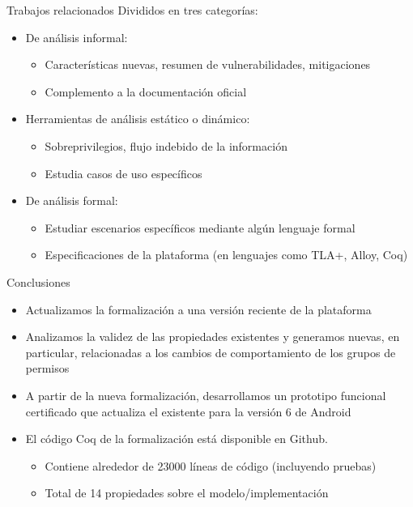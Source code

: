 \documentclass[pdf]{beamer} %
\begin{document}
\begin{frame}{Trabajos relacionados}
    Divididos en tres categorías:
    \begin{itemize}
        \item De análisis informal:
              \begin{itemize}
                  \item Características nuevas, resumen de vulnerabilidades, mitigaciones
                  \item Complemento a la documentación oficial
              \end{itemize}
              \pause
        \item Herramientas de análisis estático o dinámico:
              \begin{itemize}
                  \item Sobreprivilegios, flujo indebido de la información
                  \item Estudia casos de uso específicos
              \end{itemize}
              \pause
        \item De análisis formal:
              \begin{itemize}
                  \item Estudiar escenarios específicos mediante algún lenguaje formal
                  \item Especificaciones de la plataforma (en lenguajes como TLA+, Alloy, Coq)
              \end{itemize}
    \end{itemize}
\end{frame}

\begin{frame}{Conclusiones}
    \begin{itemize}
        \item Actualizamos la formalización a una versión reciente de la plataforma
        \item Analizamos la validez de las propiedades existentes y generamos nuevas, en particular,
              relacionadas a los cambios de comportamiento de los grupos de permisos
        \item A partir de la nueva formalización, desarrollamos un prototipo funcional certificado
              que actualiza el existente para la versión 6 de Android
        \item El código Coq de la formalización está disponible en Github.
              \begin{itemize}
                  \item Contiene alrededor de 23000 líneas de código (incluyendo pruebas)
                  \item Total de 14 propiedades sobre el modelo/implementación
              \end{itemize}
    \end{itemize}
\end{frame}
\end{document}
